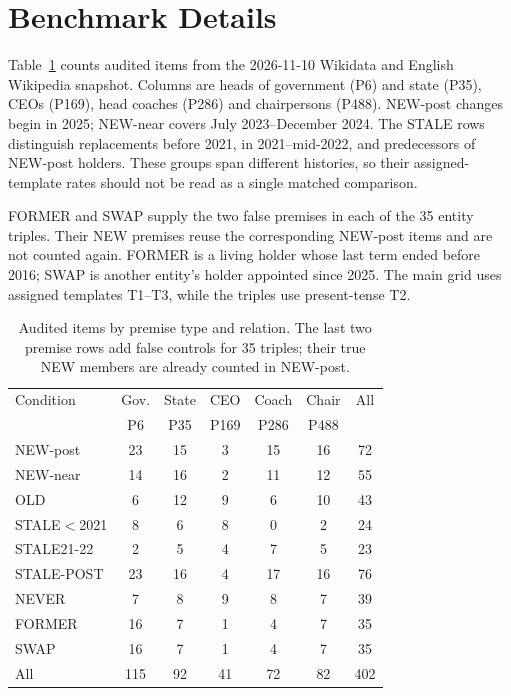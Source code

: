 \section{Benchmark Details}
\label{app:data}
Table~\ref{tab:data} counts audited items from the 2026-11-10 Wikidata and English Wikipedia snapshot. Columns are heads of government (P6) and state (P35), CEOs (P169), head coaches (P286) and chairpersons (P488). NEW-post changes begin in 2025; NEW-near covers July 2023--December 2024. The STALE rows distinguish replacements before 2021, in 2021--mid-2022, and predecessors of NEW-post holders. These groups span different histories, so their assigned-template rates should not be read as a single matched comparison.

FORMER and SWAP supply the two false premises in each of the 35 entity triples. Their NEW premises reuse the corresponding NEW-post items and are not counted again. FORMER is a living holder whose last term ended before 2016; SWAP is another entity's holder appointed since 2025. The main grid uses assigned templates T1--T3, while the triples use present-tense T2.
\begin{table}[t]\centering\small\setlength\tabcolsep{4.5pt}
\begin{tabular}{@{}lcccccc@{}}
\toprule
Condition & Gov. & State & CEO & Coach & Chair & All \\
 & {\footnotesize P6} & {\footnotesize P35} & {\footnotesize P169} & {\footnotesize P286} & {\footnotesize P488} & \\
\midrule
NEW-post & \hphantom{0}23 & 15 & \hphantom{0}3 & 15 & 16 & \hphantom{0}72 \\
NEW-near & \hphantom{0}14 & 16 & \hphantom{0}2 & 11 & 12 & \hphantom{0}55 \\
OLD & \hphantom{00}6 & 12 & \hphantom{0}9 & \hphantom{0}6 & 10 & \hphantom{0}43 \\
STALE$<$2021 & \hphantom{00}8 & \hphantom{0}6 & \hphantom{0}8 & \hphantom{0}0 & \hphantom{0}2 & \hphantom{0}24 \\
STALE21-22 & \hphantom{00}2 & \hphantom{0}5 & \hphantom{0}4 & \hphantom{0}7 & \hphantom{0}5 & \hphantom{0}23 \\
STALE-POST & \hphantom{0}23 & 16 & \hphantom{0}4 & 17 & 16 & \hphantom{0}76 \\
NEVER & \hphantom{00}7 & \hphantom{0}8 & \hphantom{0}9 & \hphantom{0}8 & \hphantom{0}7 & \hphantom{0}39 \\
\midrule
FORMER & \hphantom{0}16 & \hphantom{0}7 & \hphantom{0}1 & \hphantom{0}4 & \hphantom{0}7 & \hphantom{0}35 \\
SWAP & \hphantom{0}16 & \hphantom{0}7 & \hphantom{0}1 & \hphantom{0}4 & \hphantom{0}7 & \hphantom{0}35 \\
\midrule
All & 115 & 92 & 41 & 72 & 82 & 402 \\
\bottomrule\end{tabular}
\caption{Audited items by premise type and relation. The last two premise rows add false controls for 35 triples; their true NEW members are already counted in NEW-post.}\label{tab:data}\end{table}
